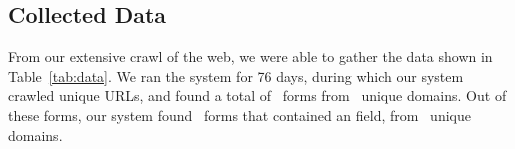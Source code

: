 \subsection{Collected Data}

From our extensive crawl of the web, we were able to gather the data
shown in Table~\ref{tab:data}. We ran the system for 76 days, during which our system crawled \urls unique URLs,
and found a total of \forms\ forms from \uniqueforms\ unique domains. Out of these forms, our system
found \emailforms\ forms that contained an \email field, from \uniqueemailforms\ unique domains.



